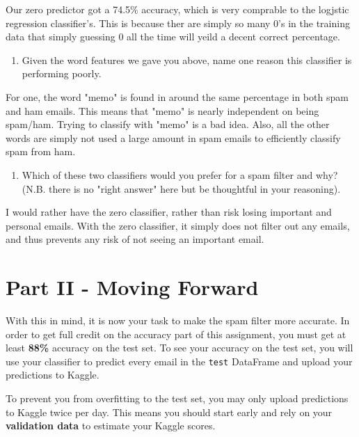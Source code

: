 \documentclass[11pt]{article}
\providecommand{\tightlist}{%
      \setlength{\itemsep}{0pt}\setlength{\parskip}{0pt}}
\begin{document}
Our zero predictor got a 74.5\% accuracy, which is very comprable to the
logjstic regression classifier's. This is because ther are simply so
many 0's in the training data that simply guessing 0 all the time will
yeild a decent correct percentage.

\begin{enumerate}
\def\labelenumi{(\alph{enumi})}
\setcounter{enumi}{4}
\tightlist
\item
  Given the word features we gave you above, name one reason this
  classifier is performing poorly.
\end{enumerate}

For one, the word "memo" is found in around the same percentage in both
spam and ham emails. This means that "memo" is nearly independent on
being spam/ham. Trying to classify with "memo" is a bad idea. Also, all
the other words are simply not used a large amount in spam emails to
efficiently classify spam from ham.

\begin{enumerate}
\def\labelenumi{(\alph{enumi})}
\setcounter{enumi}{5}
\tightlist
\item
  Which of these two classifiers would you prefer for a spam filter and
  why? (N.B. there is no "right answer" here but be thoughtful in your
  reasoning).
\end{enumerate}

I would rather have the zero classifier, rather than risk losing
important and personal emails. With the zero classifier, it simply does
not filter out any emails, and thus prevents any risk of not seeing an
important email.

    \section{Part II - Moving Forward}\label{part-ii---moving-forward}

With this in mind, it is now your task to make the spam filter more
accurate. In order to get full credit on the accuracy part of this
assignment, you must get at least \textbf{88\%} accuracy on the test
set. To see your accuracy on the test set, you will use your classifier
to predict every email in the \texttt{test} DataFrame and upload your
predictions to Kaggle.

To prevent you from overfitting to the test set, you may only upload
predictions to Kaggle twice per day. This means you should start early
and rely on your \textbf{validation data} to estimate your Kaggle
scores.
\end{document}
